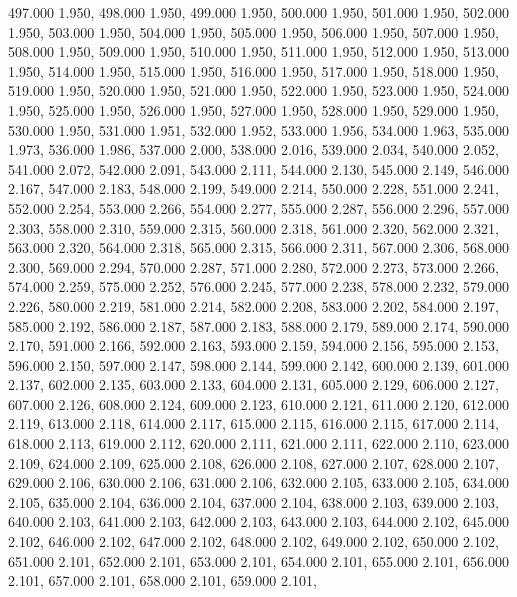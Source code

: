 497.000 1.950, 
498.000 1.950, 
499.000 1.950, 
500.000 1.950, 
501.000 1.950, 
502.000 1.950, 
503.000 1.950, 
504.000 1.950, 
505.000 1.950, 
506.000 1.950, 
507.000 1.950, 
508.000 1.950, 
509.000 1.950, 
510.000 1.950, 
511.000 1.950, 
512.000 1.950, 
513.000 1.950, 
514.000 1.950, 
515.000 1.950, 
516.000 1.950, 
517.000 1.950, 
518.000 1.950, 
519.000 1.950, 
520.000 1.950, 
521.000 1.950, 
522.000 1.950, 
523.000 1.950, 
524.000 1.950, 
525.000 1.950, 
526.000 1.950, 
527.000 1.950, 
528.000 1.950, 
529.000 1.950, 
530.000 1.950, 
531.000 1.951, 
532.000 1.952, 
533.000 1.956, 
534.000 1.963, 
535.000 1.973, 
536.000 1.986, 
537.000 2.000, 
538.000 2.016, 
539.000 2.034, 
540.000 2.052, 
541.000 2.072, 
542.000 2.091, 
543.000 2.111, 
544.000 2.130, 
545.000 2.149, 
546.000 2.167, 
547.000 2.183, 
548.000 2.199, 
549.000 2.214, 
550.000 2.228, 
551.000 2.241, 
552.000 2.254, 
553.000 2.266, 
554.000 2.277, 
555.000 2.287, 
556.000 2.296, 
557.000 2.303, 
558.000 2.310, 
559.000 2.315, 
560.000 2.318, 
561.000 2.320, 
562.000 2.321, 
563.000 2.320, 
564.000 2.318, 
565.000 2.315, 
566.000 2.311, 
567.000 2.306, 
568.000 2.300, 
569.000 2.294, 
570.000 2.287, 
571.000 2.280, 
572.000 2.273, 
573.000 2.266, 
574.000 2.259, 
575.000 2.252, 
576.000 2.245, 
577.000 2.238, 
578.000 2.232, 
579.000 2.226, 
580.000 2.219, 
581.000 2.214, 
582.000 2.208, 
583.000 2.202, 
584.000 2.197, 
585.000 2.192, 
586.000 2.187, 
587.000 2.183, 
588.000 2.179, 
589.000 2.174, 
590.000 2.170, 
591.000 2.166, 
592.000 2.163, 
593.000 2.159, 
594.000 2.156, 
595.000 2.153, 
596.000 2.150, 
597.000 2.147, 
598.000 2.144, 
599.000 2.142, 
600.000 2.139, 
601.000 2.137, 
602.000 2.135, 
603.000 2.133, 
604.000 2.131, 
605.000 2.129, 
606.000 2.127, 
607.000 2.126, 
608.000 2.124, 
609.000 2.123, 
610.000 2.121, 
611.000 2.120, 
612.000 2.119, 
613.000 2.118, 
614.000 2.117, 
615.000 2.115, 
616.000 2.115, 
617.000 2.114, 
618.000 2.113, 
619.000 2.112, 
620.000 2.111, 
621.000 2.111, 
622.000 2.110, 
623.000 2.109, 
624.000 2.109, 
625.000 2.108, 
626.000 2.108, 
627.000 2.107, 
628.000 2.107, 
629.000 2.106, 
630.000 2.106, 
631.000 2.106, 
632.000 2.105, 
633.000 2.105, 
634.000 2.105, 
635.000 2.104, 
636.000 2.104, 
637.000 2.104, 
638.000 2.103, 
639.000 2.103, 
640.000 2.103, 
641.000 2.103, 
642.000 2.103, 
643.000 2.103, 
644.000 2.102, 
645.000 2.102, 
646.000 2.102, 
647.000 2.102, 
648.000 2.102, 
649.000 2.102, 
650.000 2.102, 
651.000 2.101, 
652.000 2.101, 
653.000 2.101, 
654.000 2.101, 
655.000 2.101, 
656.000 2.101, 
657.000 2.101, 
658.000 2.101, 
659.000 2.101, 
